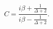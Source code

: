 \begin{equation}
C=\frac{i \beta + \frac{1}{\Delta+2}}{i \beta - \frac{1}{\Delta+2}}.
\end{equation}

